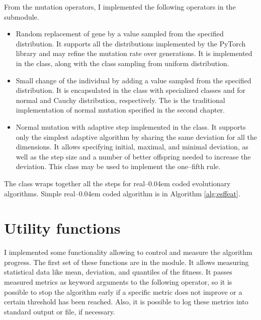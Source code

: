 From the mutation operators, I implemented the following operators in the  submodule.
\begin{itemize}
    \item Random replacement of gene by a value sampled from the specified distribution. It supports all the distributions implemented by the PyTorch library \citep{PyTorchDoc} and may refine the mutation rate over generations. It is implemented in the  class, along with the  class sampling from uniform distribution.
    \item Small change of the individual by adding a value sampled from the specified distribution. It is encapsulated in the  class with specialized classes  and  for normal and Cauchy distribution, respectively. The  is the traditional implementation of normal mutation specified in the second chapter.
    \item Normal mutation with adaptive step implemented in the  class. It supports only the simplest adaptive algorithm by sharing the same deviation for all the dimensions. It allows specifying initial, maximal, and minimal deviation, as well as the step size and a number of better offspring needed to increase the deviation. This class may be used to implement the one--fifth rule.
\end{itemize}

The  class wraps together all the steps for real--\kern0.04em coded evolutionary algorithms. Simple real--\kern0.04em coded algorithm is in Algorithm \ref{alg:esffeat}.
    



\section{Utility functions}

I implemented some functionality allowing to control and measure the algorithm progress. The first set of these functions are in the  module. It allows measuring statistical data like mean, deviation, and quantiles of the fitness. It passes measured metrics as keyword arguments to the following operator, so it is possible to stop the algorithm early if a specific metric does not improve or a certain threshold has been reached. Also, it is possible to log these metrics into standard output or file, if necessary.

